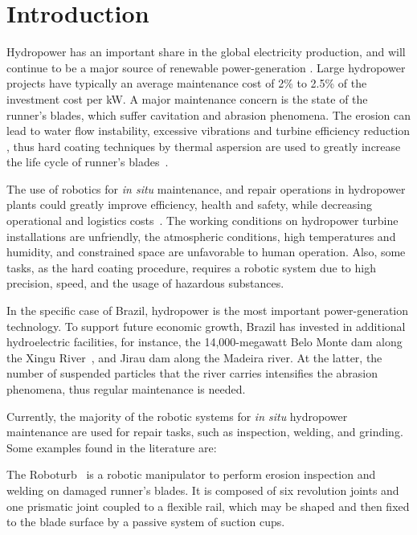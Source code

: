 \section{Introduction}

Hydropower has an important share in the global electricity production, and
will continue to be a major source of renewable power-generation \cite{iea}.
Large hydropower projects have typically an ave\-rage maintenance cost of 2\%
to 2.5\% of the investment cost per kW. A major maintenance concern
is the state of the runner's blades, which suffer cavitation and abrasion phenomena. The erosion can lead to water flow instability, excessive
vibrations and turbine efficiency reduction \cite{goldemberg2007energia}, thus
hard coating techniques by thermal aspersion are used to greatly increase the
life cycle of runner's blades~\cite{krella2011new}.

The use of robotics for \textit{in situ} maintenance, and repair operations in
hydropower plants could greatly improve efficiency, health and safety, while
decreasing operational and logistics costs~\cite{hazel2012field}. The working
conditions on hydropower turbine installations are unfriendly, the atmospheric
conditions, high temperatures and humidity, and constrained space are
unfavorable to human operation. Also, some tasks, as the hard coating
procedure, requires a robotic system due to high precision, speed, and the
usage of hazardous substances.

In the specific case of Brazil, hydropower is the most important
power-generation technology. To support future economic growth, Brazil has
invested in additional hydroelectric facilities, for instance, the
14,000-megawatt Belo Monte dam along the Xingu River~\cite{eia}, and Jirau dam
along the Madeira river. At the latter, the number of suspended particles that
the river carries intensifies the abrasion phenomena, thus regular maintenance
is needed.

Currently, the majority of the robotic systems for \textit{in situ} hydropower
maintenance are used for repair tasks, such as inspection, welding, and
grinding. Some examples found in the literature are:

The Roboturb~\cite{roboturb} is a robotic manipulator to perform erosion
inspection and welding on damaged runner's blades. It is composed of six
revolution joints and one prismatic joint coupled to a flexible rail, which may
be shaped and then fixed to the blade surface by a passive system of suction cups.

